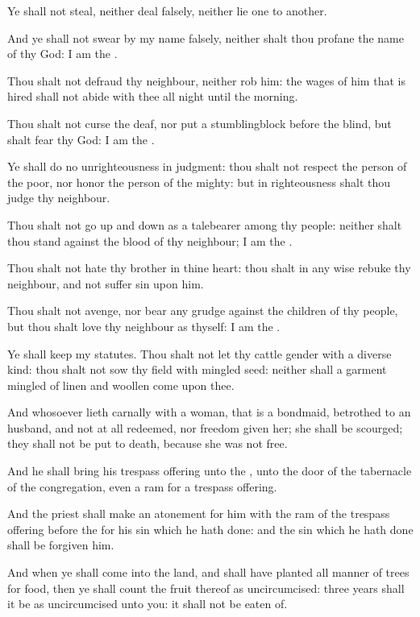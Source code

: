 \verse Ye shall not steal, neither deal falsely, neither lie one to another.

\verse And ye shall not swear by my name falsely, neither shalt thou profane the name of thy God: I am the \LORD.

\verse Thou shalt not defraud thy neighbour, neither rob him: the wages of him that is hired shall not abide with thee all night until the morning.

\verse Thou shalt not curse the deaf, nor put a stumblingblock before the blind, but shalt fear thy God: I am the \LORD.

\verse Ye shall do no unrighteousness in judgment: thou shalt not respect the person of the poor, nor honor the person of the mighty: but in righteousness shalt thou judge thy neighbour.

\verse Thou shalt not go up and down as a talebearer among thy people: neither shalt thou stand against the blood of thy neighbour; I am the \LORD.

\verse Thou shalt not hate thy brother in thine heart: thou shalt in any wise rebuke thy neighbour, and not suffer sin upon him.

\verse Thou shalt not avenge, nor bear any grudge against the children of thy people, but thou shalt love thy neighbour as thyself: I am the \LORD.

\verse Ye shall keep my statutes. Thou shalt not let thy cattle gender with a diverse kind: thou shalt not sow thy field with mingled seed: neither shall a garment mingled of linen and woollen come upon thee.

\verse And whosoever lieth carnally with a woman, that is a bondmaid, betrothed to an husband, and not at all redeemed, nor freedom given her; she shall be scourged; they shall not be put to death, because she was not free.

\verse And he shall bring his trespass offering unto the \LORD, unto the door of the tabernacle of the congregation, even a ram for a trespass offering.

\verse And the priest shall make an atonement for him with the ram of the trespass offering before the \LORD for his sin which he hath done: and the sin which he hath done shall be forgiven him.

\verse And when ye shall come into the land, and shall have planted all manner of trees for food, then ye shall count the fruit thereof as uncircumcised: three years shall it be as uncircumcised unto you: it shall not be eaten of.


